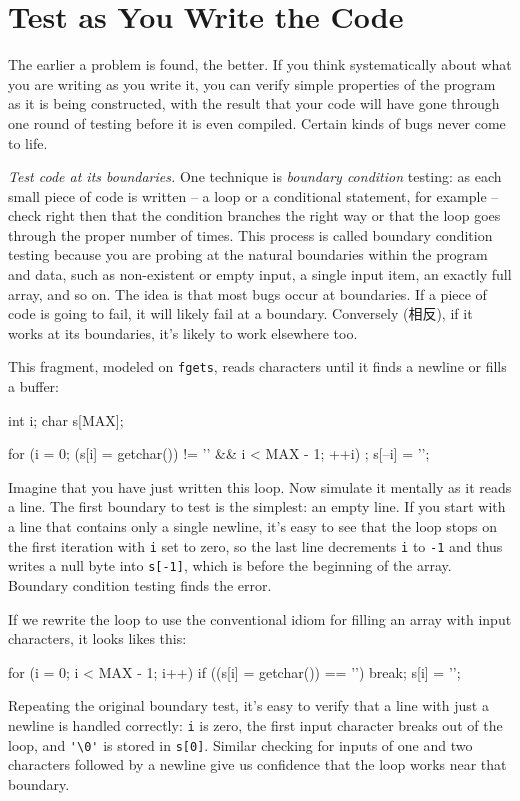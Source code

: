 \section{Test as You Write the Code}
\label{sec:test_as_you_write_the_code}

The earlier a problem is found, the better. If you think systematically
about what you are writing as you write it, you can verify simple
properties of the program as it is being constructed, with the result that
your code will have gone through one round of testing before it is even
compiled. Certain kinds of bugs never come to life.

\emph{Test code at its boundaries.} One technique is \textit{boundary
    condition} testing: as each small piece of code is written -- a loop or
a conditional statement, for example -- check right then that the condition
branches the right way or that the loop goes through the proper number of
times. This process is called boundary condition testing because you are
probing at the natural boundaries within the program and data, such as
non-existent or empty input, a single input item, an exactly full array,
and so on. The idea is that most bugs occur at boundaries. If a piece of
code is going to fail, it will likely fail at a boundary. Conversely
(相反), if it works at its boundaries, it's likely to work elsewhere too.

This fragment, modeled on \verb'fgets', reads characters until it finds a
newline or fills a buffer:
\begin{badcode}
    int     i;
    char    s[MAX];

    for (i = 0; (s[i] = getchar()) != '\n' && i < MAX - 1; ++i)
        ;
    s[--i] = '\0';
\end{badcode}
Imagine that you have just written this loop. Now simulate it mentally as
it reads a line. The first boundary to test is the simplest: an empty line.
If you start with a line that contains only a single newline, it's easy to
see that the loop stops on the first iteration with \verb'i' set to zero,
so the last line decrements \verb'i' to \verb'-1' and thus writes a null
byte into \verb's[-1]', which is before the beginning of the array.
Boundary condition testing finds the error.

If we rewrite the loop to use the conventional idiom for filling an array
with input characters, it looks likes this:
\begin{wellcode}
    for (i = 0; i < MAX - 1; i++)
        if ((s[i] = getchar()) == '\n')
            break;
    s[i] = '\0';
\end{wellcode}
Repeating the original boundary test, it's easy to verify that a line with
just a newline is handled correctly: \verb'i' is zero, the first input
character breaks out of the loop, and \verb"'\0'" is stored in \verb's[0]'.
Similar checking for inputs of one and two characters followed by a newline
give us confidence that the loop works near that boundary.

